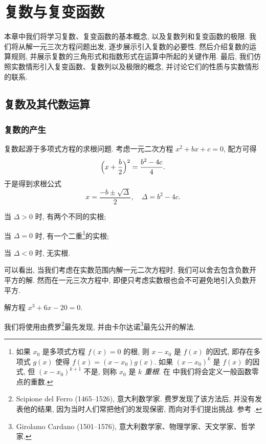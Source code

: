 \chapter{复数与复变函数}
\label{chapter:1}

本章中我们将学习复数、复变函数的基本概念, 以及复数列和复变函数的极限.
我们将从解一元三次方程问题出发, 逐步展示引入复数的必要性. 然后介绍复数的运算规则, 并展示复数的三角形式和指数形式在运算中所起的关键作用. 最后, 我们仿照实数情形引入复变函数、复数列以及极限的概念, 并讨论它们的性质与实数情形的联系.

\section{复数及其代数运算}

\subsection{复数的产生}

复数起源于多项式方程的求根问题. 
考虑一元二次方程 $x^2+bx+c=0$, 配方可得
\[
  \Bigl(x+\frac b2\Bigr)^2=\frac{b^2-4c}4.
\]
于是得到求根公式
\[
  x=\frac{-b\pm\sqrt\Delta}2,\quad \Delta=b^2-4c.
\]
\begin{enumnopar}
  \item 当 $\Delta>0$ 时, 有两个不同的实根;
  \item 当 $\Delta=0$ 时, 有一个二重\footnote{%
    如果 $x_0$ 是多项式方程 $f(x)=0$ 的根, 则 $x-x_0$ 是 $f(x)$ 的因式, 即存在多项式 $g(x)$ 使得 $f(x)=(x-x_0)g(x)$.
    如果 $(x-x_0)^k$ 是 $f(x)$ 的因式, 但 $(x-x_0)^{k+1}$ 不是, 则称 $x_0$ 是 \emph{$k$ 重根}.
    在 中我们将会定义一般函数零点的重数.
  }的实根;
  \item 当 $\Delta<0$ 时, 无实根.
\end{enumnopar}


可以看出, 当我们考虑在实数范围内解一元二次方程时, 我们可以舍去包含\alert{负数开平方}的解.
然而在一元三次方程中, 即便只考虑实数根也会不可避免地引入负数开平方.

\begin{example}
  解方程 $x^3+6x-20=0$.
\end{example}

我们将使用由费罗\footnote{%
  Scipione del Ferro (1465--1526), 意大利数学家.
  费罗发现了该方法后, 并没有发表他的结果, 因为当时人们常把他们的发现保密, 而向对手们提出挑战. 参考 \cite[第13章4节]{Kline1990}.
}最先发现, 并由卡尔达诺\footnote{%
  Girolamo Cardano (1501--1576), 意大利数学家、物理学家、天文学家、哲学家.
}最先公开的解法.

